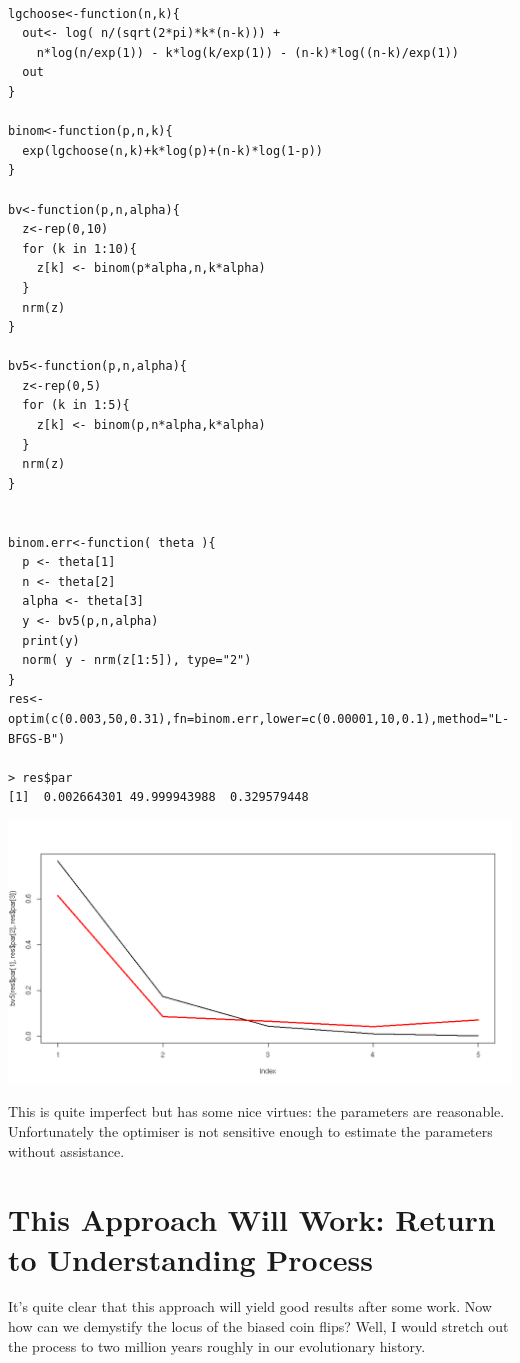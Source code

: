 \documentclass{amsart}
\begin{document}
\begin{verbatim}

lgchoose<-function(n,k){
  out<- log( n/(sqrt(2*pi)*k*(n-k))) + 
    n*log(n/exp(1)) - k*log(k/exp(1)) - (n-k)*log((n-k)/exp(1))
  out
}

binom<-function(p,n,k){
  exp(lgchoose(n,k)+k*log(p)+(n-k)*log(1-p))
}

bv<-function(p,n,alpha){
  z<-rep(0,10)
  for (k in 1:10){
    z[k] <- binom(p*alpha,n,k*alpha)
  }
  nrm(z) 
}

bv5<-function(p,n,alpha){
  z<-rep(0,5)
  for (k in 1:5){
    z[k] <- binom(p,n*alpha,k*alpha)
  }
  nrm(z) 
}


binom.err<-function( theta ){
  p <- theta[1]
  n <- theta[2]
  alpha <- theta[3]
  y <- bv5(p,n,alpha)
  print(y)
  norm( y - nrm(z[1:5]), type="2")
}
res<-optim(c(0.003,50,0.31),fn=binom.err,lower=c(0.00001,10,0.1),method="L-BFGS-B")

> res$par
[1]  0.002664301 49.999943988  0.329579448
\end{verbatim}

\includegraphics[scale=0.3]{fit_scaled_binomial_Q179.png}

This is quite imperfect but has some nice virtues: the parameters are  reasonable.  Unfortunately the optimiser is not sensitive enough to estimate the parameters without assistance.

\section{This Approach Will Work: Return to Understanding Process}

It's quite clear that this approach will yield good results after some work.  Now how can we demystify the locus of the biased coin flips?  Well, I would stretch out the process to two million years roughly in our evolutionary history.  
\end{document}
